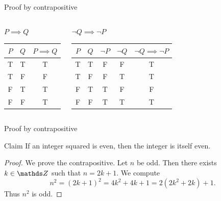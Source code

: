 \documentclass [aspectratio=169]{beamer}
\begin{document}
\begin{frame}{Proof by contrapositive}
    \begin{columns}
        \begin{center}
        $P \implies Q$ \\
        \vspace{1.5em}
\begin{tabular}{|c|c| c|}
\hline
     $P$& $Q$ &  $P \implies Q$ \\ \hline
     T& T & T \\ \hline
     T & F & F \\ \hline
     F & T & T \\ \hline
     F & F & T \\ \hline
\end{tabular}
\end{center}
        \begin{center}
        $\neg Q \implies \neg P$ \\
        \vspace{1.5em}
        \begin{tabular}{|c | c | c |  c | c |}
\hline
     $P$& $Q$ & $\neg P$ &  $\neg Q$ & $\neg Q \implies \neg P$ \\ \hline
     T& T & F & F & T \\ \hline
     T & F & F &  T & T \\ \hline
     F & T &  T  & F & F \\ \hline
     F & F & T & T & T \\ \hline
\end{tabular}
\end{center}
\end{columns}
\end{frame}

\begin{frame}{Proof by contrapositive}
\begin{exampleblock}{Claim}
If an integer squared is even, then the integer is itself even.
\end{exampleblock}

\vspace{1em}

\begin{proof}
We prove the contrapositive. Let $n$ be odd. Then there exists $k \in \Z$ such that $n = 2k + 1$. We compute
$$n^2 = (2k + 1)^2 = 4k^2 + 4k + 1 = 2(2k^2+2k) + 1.$$
Thus $n^2$ is odd.

\end{proof}

\end{frame}
\end{document}
